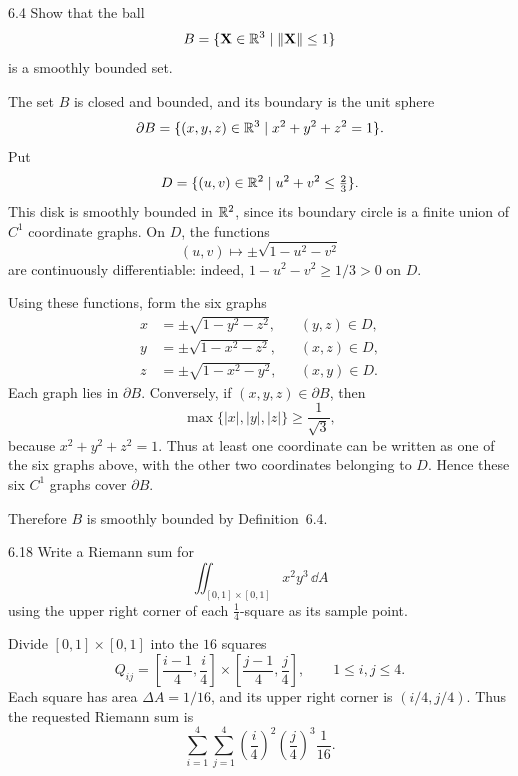 \documentclass[11pt,oneside]{article}
\begin{document}

\begin{problem}{6.4}
Show that the ball
\[
    B=\{\mathbf X\in\mathbb{R}^3\mid\|\mathbf X\|\leq1\}
\]
is a smoothly bounded set.
\end{problem}

\begin{solution}
The set $B$ is closed and bounded, and its boundary is the unit sphere
\[
    \partial B=\{(x,y,z)\in\mathbb{R}^3\mid x^2+y^2+z^2=1\}.
\]
Put
\[
    D=\{(u,v)\in\mathbb{R}^2\mid u^2+v^2\leq\tfrac23\}.
\]
This disk is smoothly bounded in $\mathbb{R}^2$, since its boundary circle is a finite union of $C^1$ coordinate graphs.  On $D$, the functions
\[
    (u,v)\longmapsto\pm\sqrt{1-u^2-v^2}
\]
are continuously differentiable: indeed, $1-u^2-v^2\geq1/3>0$ on $D$.

Using these functions, form the six graphs
\[
\begin{aligned}
    x&=\pm\sqrt{1-y^2-z^2}, &&(y,z)\in D,\\
    y&=\pm\sqrt{1-x^2-z^2}, &&(x,z)\in D,\\
    z&=\pm\sqrt{1-x^2-y^2}, &&(x,y)\in D.
\end{aligned}
\]
Each graph lies in $\partial B$. Conversely, if $(x,y,z)\in\partial B$, then
\[
    \max\{|x|,|y|,|z|\}\geq\frac1{\sqrt3},
\]
because $x^2+y^2+z^2=1$. Thus at least one coordinate can be written as one of the six graphs above, with the other two coordinates belonging to $D$. Hence these six $C^1$ graphs cover $\partial B$.

Therefore $B$ is smoothly bounded by Definition~6.4.
\end{solution}

\begin{problem}{6.18}
Write a Riemann sum for
\[
    \iint_{[0,1]\times[0,1]}x^2y^3\,\dd A
\]
using the upper right corner of each $\tfrac14$-square as its sample point.
\end{problem}

\begin{solution}
Divide $[0,1]\times[0,1]$ into the $16$ squares
\[
    Q_{ij}=\left[\frac{i-1}{4},\frac i4\right]
           \times\left[\frac{j-1}{4},\frac j4\right],
    \qquad 1\leq i,j\leq4.
\]
Each square has area $\Delta A=1/16$, and its upper right corner is
$(i/4,j/4)$. Thus the requested Riemann sum is
\[
    \boxed{\sum_{i=1}^{4}\sum_{j=1}^{4}
       \left(\frac i4\right)^2\left(\frac j4\right)^3\frac1{16}}.
\]
\end{solution}
\end{document}
